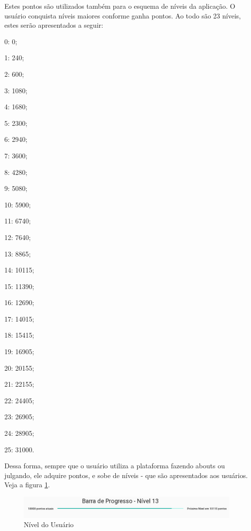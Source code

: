 Estes pontos são utilizados também para o esquema de níveis da aplicação. O usuário conquista níveis maiores
conforme ganha pontos. Ao todo são 23 níveis, estes serão apresentados a seguir:

\begin{itemize}
    \begin{multicols}{2}
        \item 0: 0;
        \item 1: 240;
        \item 2: 600;
        \item 3: 1080;
        \item 4: 1680;
        \item 5: 2300;
        \item 6: 2940;
        \item 7: 3600;
        \item 8: 4280;
        \item 9: 5080;
        \item 10: 5900;
        \item 11: 6740;
        \item 12: 7640;
        \item 13: 8865;
        \item 14: 10115;
        \item 15: 11390;
        \item 16: 12690;
        \item 17: 14015;
        \item 18: 15415;
        \item 19: 16905;
        \item 20: 20155;
        \item 21: 22155;
        \item 22: 24405;
        \item 23: 26905;
        \item 24: 28905;
        \item 25: 31000.
    \end{multicols}
\end{itemize}

Dessa forma, sempre que o usuário utiliza a plataforma fazendo abouts ou julgando, ele adquire pontos,
e sobe de níveis - que são apresentados aos usuários.
Veja a figura \ref{fig:niveis}.

\begin{figure}[h]
    \centering
    \includegraphics[width=450px, scale=1]{figuras/niveis2}
    \caption{Nível do Usuário}
    \label{fig:niveis}
\end{figure}

